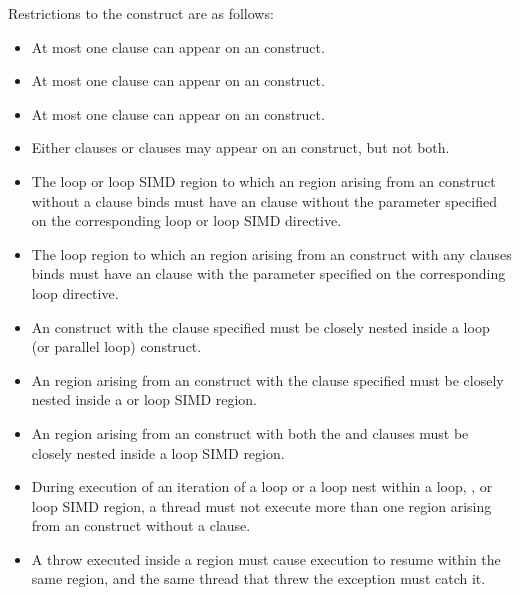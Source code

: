 

\restrictions
Restrictions to the  construct are as follows:

\begin{itemize}
\item At most one  clause can appear on an  construct.

\item At most one  clause can appear on an  construct.

\item At most one  clause can appear on an  construct.

\item Either {} clauses or 
clauses may appear on an  construct, but not both.

\item The loop or loop SIMD region to which an 
region arising from an  construct without a 
clause binds must have an  clause without the parameter
specified on the corresponding loop or loop SIMD directive.

\item The loop region to which an  region arising from an
 construct with any 
clauses binds must have an  clause with the parameter specified
on the corresponding loop directive.

\item An  construct with the  clause specified must
be closely nested inside a loop (or parallel loop) construct.

\item An  region arising from an  construct with
the  clause specified must be closely nested inside a
 or loop SIMD region.

\item An  region arising from an  construct with
  both the  and  clauses must be closely nested inside
  a loop SIMD region.

\item During execution of an iteration of a loop or a loop nest within a loop, , or loop SIMD
region, a thread must not execute more than one  region arising
from an  construct without a  clause.
\end{itemize}
\begin{cppspecific}
\begin{itemize}
\item A throw executed inside a  region must cause execution to
resume within the same  region, and the same thread that threw
the exception must catch it.
\end{itemize}
\end{cppspecific}



